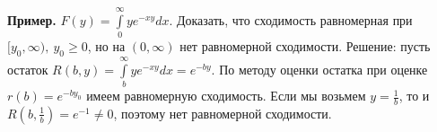 \textbf{Пример.} $F(y)=\int\limits_{0}^{\infty}ye^{-xy}dx$. Доказать, что 
сходимость равномерная при $[y_0,\infty),~y_0\geqslant0$, но на 
$(0,\infty)$ нет равномерной сходимости. Решение: пусть остаток
$R(b,y)=\int\limits_{b}^{\infty}ye^{-xy}dx=e^{-by}$. По методу оценки
остатка при оценке $r(b)=e^{-by_0}$ имеем равномерную сходимость.
Если мы возьмем $y=\frac{1}{b}$, то и $R(b,\frac{1}{b})=e^{-1}\ne0$, поэтому
нет равномерной сходимости. 



